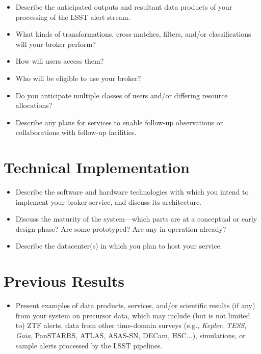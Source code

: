 \documentclass[11pt, letterpaper]{article}
\begin{document}
\begin{itemize}
\item Describe the anticipated outputs and resultant data products of your processing of the LSST alert stream. 
\item What kinds of transformations, cross-matches, filters, and/or classifications will your broker perform?
\item How will users access them?
\item Who will be eligible to use your broker?
\item Do you anticipate multiple classes of users and/or differing resource allocations?
\item Describe any plans for services to enable follow-up observations or collaborations with follow-up facilities.
\end{itemize}



\section{Technical Implementation}

\begin{itemize}
\item Describe the software and hardware technologies with which you intend to implement your broker service, and discuss its architecture.
\item Discuss the maturity of the system---which parts are at a conceptual or early design phase?  Are some prototyped? Are any in operation already?
\item Describe the datacenter(s) in which you plan to host your service.
\end{itemize}


\section{Previous Results}

\begin{itemize}
\item Present examples of data products, services, and/or scientific results (if any) from your system on precursor data, which may include (but is not limited to) ZTF alerts, data from other time-domain surveys (e.g., \textit{Kepler}, \textit{TESS}, \textit{Gaia}, PanSTARRS, ATLAS, ASAS-SN, DECam, HSC...), simulations, or sample alerts processed by the LSST pipelines.
\end{itemize}
	
\end{document}
